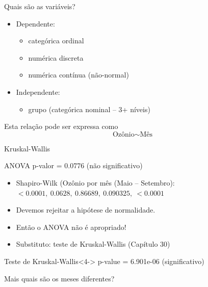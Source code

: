 \documentclass{beamer}
\begin{document}
\begin{frame}{\scriptsize Quais são as variáveis?}
  \begin{itemize}
    \footnotesize
  \item Dependente:
    \begin{itemize}
      \scriptsize
    \item categórica ordinal
    \item numérica discreta
    \item numérica contínua (não-normal)
    \end{itemize}
  \item Independente:
    \begin{itemize}
      \scriptsize
    \item grupo (categórica nominal -- 3+ níveis)
    \end{itemize}
  \end{itemize}
  \vfill
  \begin{block}{Esta relação pode ser expressa como}
    \footnotesize
    \begin{displaymath}
      \text{Ozônio} \sim \text{Mês}
    \end{displaymath}
  \end{block}
\end{frame}

\begin{frame}{\scriptsize Kruskal-Wallis}
  \begin{exampleblock}{ANOVA}
    \footnotesize
    p-valor = 0.0776 (não significativo)
  \end{exampleblock}
  \begin{itemize}
    \footnotesize
  \item<2-> Shapiro-Wilk (Ozônio por mês (Maio -- Setembro): {\tiny $< 0.0001,\ 0.0628,\ 0.86689,\ 0.090325,\ < 0.0001$}
    \bigskip
  \item<3-> Devemos rejeitar a hipótese de normalidade.
  \item<3-> Então o ANOVA \alert{não é} apropriado!
    \bigskip
  \item<3-> Substituto: teste de Kruskal-Wallis (Capítulo 30)
  \end{itemize}
  \bigskip
  \begin{exampleblock}{Teste de Kruskal-Wallis}<4->
    \footnotesize
    p-value = \alert{6.901e-06} (significativo)
  \end{exampleblock}
\end{frame}

\begin{frame}{\scriptsize }
  \begin{center}
    Mais quais são os meses diferentes?
  \end{center}
\end{frame}
\end{document}
